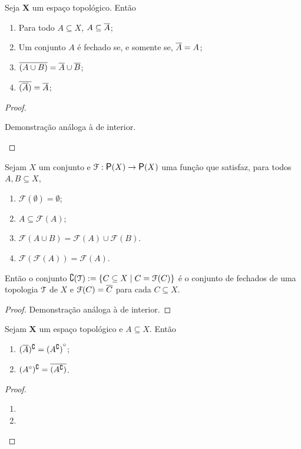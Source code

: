 \begin{proposition}
	Seja $\bm X$ um espaço topológico. Então
	\begin{enumerate}	
	\item Para todo $A \subseteq X$, $A \subseteq \overline{A}$;
	\item Um conjunto $A$ é fechado se, e somente se, $\overline{A}=A$;
	\item $\overline{(A \cup B)} = \overline{A} \cup \overline{B}$;
	\item $\overline{(\overline{A})} = \overline{A}$;
	\end{enumerate}
\end{proposition}
\begin{proof}
	\begin{enumerate}
	Demonstração análoga à de interior.
	\end{enumerate}
\end{proof}

\begin{proposition}
	Sejam $X$ um conjunto e $\mathcal F: \p(X) \to \p(X)$ uma função que satisfaz, para todos $A,B \subseteq X$,
	\begin{enumerate}
	\item $\mathcal F(\emptyset) = \emptyset$;
	\item $A \subseteq \mathcal F(A)$;
	\item $\mathcal F(A \cup B) = \mathcal F(A) \cup \mathcal F(B)$.
	\item $\mathcal F(\mathcal F(A)) = \mathcal F(A)$.
	\end{enumerate}
	
Então o conjunto $\complement(\mathcal{T}) := \left\{{C \subseteq X}\;\middle\vert\;{C = \mathcal F(C)}\right\}$ é o conjunto de fechados de uma topologia $\mathcal{T}$ de $X$ e $\mathcal F(C) = \overline{C}$ para cada $C \subseteq X$.
\end{proposition}
\begin{proof}
	Demonstração análoga à de interior.
\end{proof}


\begin{proposition}
	Sejam $\bm X$ um espaço topológico e $A \subseteq X$. Então
	\begin{enumerate}
	\item $(\overline{A})^\complement = {(A^\complement)}^\circ$;
	\item $({A}^\circ)^\complement = \overline{(A^\complement)}$.
	\end{enumerate}
\end{proposition}
\begin{proof}
	\begin{enumerate}
	\item
	\item
	\end{enumerate}
\end{proof}


